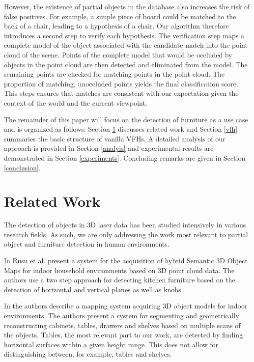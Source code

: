 \documentclass[letterpaper, 10pt, conference]{ieeeconf}
\begin{document}
However, the existence of partial objects in the database also increases the
risk of false positives. For example, a simple piece of board could be
matched to the back of a chair, leading to a hypothesis of a chair. Our
algorithm therefore introduces a second step to verify each hypothesis. The verification step maps a complete model of the object associated with the candidate match into the point cloud of the scene. Points of the complete model that would be occluded by
objects in the point cloud are then detected and eliminated from the model. The remaining points are checked for matching points in the
point cloud. The proportion of matching, unoccluded points yields the final classification score. 
This steps ensures that matches are consistent with our expectation given the
context of the world and the current viewpoint.

The remainder of this paper will focus on the detection of furniture as a use
case and is organized as follows: Section \ref{relate} discusses related work and Section \ref{vfh} summaries the basic structure of
vanilla VFHs. A detailed analysis of our approach is provided in Section
\ref{analyis} and experimental results are demonstrated in Section
\ref{experiments}. Concluding remarks are given in Section \ref{conclusion}.


\section{Related Work}
\label{relate}
The detection of objects in 3D laser data has been studied intensively in
various research fields. As such, we are only addressing the work most relevant
to partial object and furniture detection in human environments.

In \cite{Rusu} Rusu et al. present a system for the acquisition of hybrid Semantic 3D Object Maps for indoor household environments based on 3D point cloud data. The authors use a two step approach for detecting kitchen furniture based on the detection of horizontal and vertical planes as well as knobs.

In \cite{Blodow2007} the authors describe a mapping system acquiring 3D object models for indoor environments. The authors present a system for segmenting and geometrically reconstructing cabinets, tables, drawers and shelves based on multiple scans of the objects. Tables, the most relevant part to our work, are detected by finding horizontal surfaces within a given height range. This does not allow for distinguishing between, for example, tables and shelves.
\end{document}
